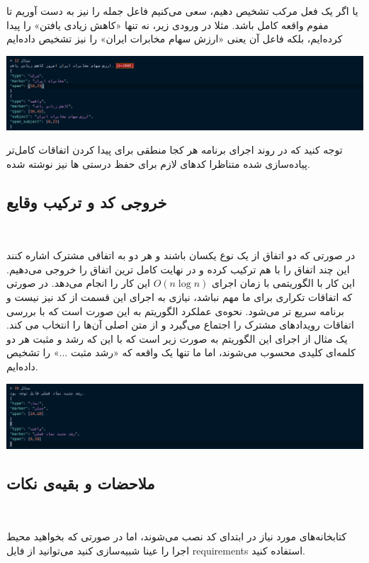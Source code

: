 \documentclass[a4paper,12pt]{article}
\begin{document}
یا اگر یک فعل مرکب تشخیص دهیم، سعی می‌کنیم فاعل جمله‌ را نیز به دست آوریم تا مفوم 
واقعه کامل باشد. مثلا در ورودی زیر، نه تنها «کاهش زیادی یافتن» را پیدا کرده‌ایم، بلکه 
فاعل آن یعنی «ارزش سهام مخابرات 
ایران» را نیز تشخیص داده‌ایم 
\begin{center}
	\includegraphics[scale=0.5, trim ={0 0 17cm 0}, clip]{images/12.png}
\end{center}
  توجه کنید که در روند اجرای برنامه هر کجا منطقی برای پیدا کردن اتفاقات کامل‌تر پیاده‌سازی شده متناظرا کد‌های لازم برای حفظ درستی
  ها نیز نوشته شده.

\subsection*{خروجی کد و ترکیب وقایع}
\


  در صورتی که دو اتفاق از یک نوع یکسان باشند و هر دو به اتفاقی مشترک اشاره کنند
  این چند اتفاق را با هم ترکیب کرده و در نهایت کامل ‌ترین اتفاق را خروجی می‌دهیم. 
    این کار با الگوریتمی  با زمان اجرای 
 $O(n \log n)$
این کار را انجام می‌دهد. در صورتی که اتفاقات تکراری برای ما مهم نباشد، 
نیازی به اجرای این قسمت از کد نیز نیست و برنامه سریع تر می‌شود. 
نحوه‌ی عملکرد الگوریتم به این صورت است که با بررسی 
  اتفاقات رویدادهای مشترک را اجتماع می‌گیرد و از متن اصلی آن‌ها را انتخاب می کند. یک مثال از اجرای این الگوریتم به صورت 
  زیر است که با این که رشد و مثبت هر دو کلمه‌ای کلیدی محسوب می‌شوند، اما 
  ما تنها یک واقعه که «رشد مثبت ...» را تشخیص داده‌ایم. 

\begin{center}
	\includegraphics[scale=0.5, trim ={0 0 17cm 0}, clip]{images/16.png}
\end{center}



\subsection*{ملاحضات و بقیه‌ی نکات}
\

کتابخانه‌های مورد نیاز در ابتدای کد نصب می‌شوند، اما در صورتی که بخواهید محیط اجرا را 
عینا شبیه‌سازی کنید می‌توانید از فایل 
requirements 
استفاده کنید. 
\end{document}
